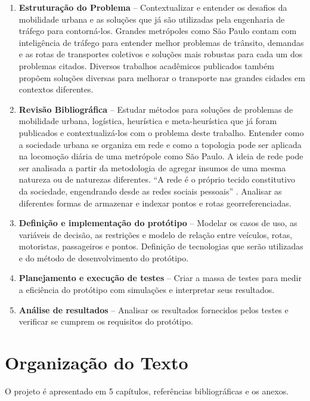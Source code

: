 \begin{enumerate}
\item \textbf{Estruturação do Problema} --
Contextualizar e entender os desafios da mobilidade urbana e as soluções que já são utilizadas pela engenharia de tráfego para contorná-los. Grandes metrópoles como São Paulo contam com inteligência de tráfego para entender melhor problemas de trânsito, demandas e as rotas de transportes coletivos e soluções mais robustas para cada um dos problemas citados. Diversos trabalhos acadêmicos publicados também propõem soluções diversas para melhorar o transporte nas grandes cidades em contextos diferentes.


\item \textbf{Revisão Bibliográfica} --
Estudar métodos para soluções de problemas de mobilidade urbana, logística, heurística e meta-heurística que já foram publicados e contextualizá-los com o problema deste trabalho. Entender como a sociedade urbana se organiza em rede e como a topologia pode ser aplicada na locomoção diária de uma metrópole como São Paulo.  A ideia de rede pode ser analisada a partir da metodologia de agregar insumos de uma mesma natureza ou de naturezas diferentes. ``A rede é o próprio tecido constitutivo da sociedade, engendrando desde as redes sociais pessoais'' \cite{inojosa}. Analisar as diferentes formas de armazenar e indexar pontos e rotas georreferenciadas.

\item \textbf{Definição e implementação do protótipo} --
Modelar os casos de uso, as variáveis de decisão, as restrições e modelo de relação entre veículos, rotas, motoristas, passageiros e pontos. Definição de tecnologias que serão utilizadas e do método de desenvolvimento do protótipo.

\item \textbf{Planejamento e execução de testes} --
Criar a massa de testes para medir a eficiência do protótipo com simulações e interpretar seus resultados.

\item \textbf{Análise de resultados} -- 
Analisar os resultados fornecidos pelos testes e verificar se cumprem os requisitos do protótipo.
\end{enumerate}

\section{Organização do Texto}

O projeto é apresentado em 5 capítulos, referências bibliográficas e os anexos.

